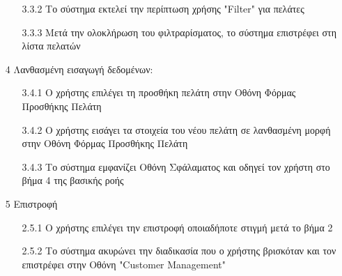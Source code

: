 \documentclass[12pt,a4paper,twoside]{book}
\begin{document}
\begin{enumerate}
\begin{enumerate}
          \item[3.3.2 ] Το σύστημα εκτελεί την περίπτωση χρήσης "Filter" για πελάτες %
          \item[3.3.3 ] Μετά την ολοκλήρωση του φιλτραρίσματος, το σύστημα επιστρέφει στη λίστα πελατών
        \end{enumerate}
  \item[4 ] Λανθασμένη εισαγωγή δεδομένων: %
        \begin{enumerate}
          \item[3.4.1 ] Ο χρήστης επιλέγει τη προσθήκη πελάτη στην Οθόνη Φόρμας Προσθήκης Πελάτη
          \item[3.4.2 ] Ο χρήστης εισάγει τα στοιχεία του νέου πελάτη σε λανθασμένη μορφή στην Οθόνη Φόρμας Προσθήκης Πελάτη
          \item[3.4.3 ] Το σύστημα εμφανίζει Οθόνη Σφάλαματος και οδηγεί τον χρήστη στο βήμα 4 της βασικής ροής %
        \end{enumerate}
  \item[5 ] Επιστροφή
        \begin{enumerate}
          \item[2.5.1 ] Ο χρήστης επιλέγει την επιστροφή οποιαδήποτε στιγμή μετά το βήμα 2 %
          \item[2.5.2 ] Το σύστημα ακυρώνει την διαδικασία που ο χρήστης βρισκόταν και τον επιστρέφει στην Οθόνη "Customer Management" %
        \end{enumerate}

\end{enumerate}
\end{document}
